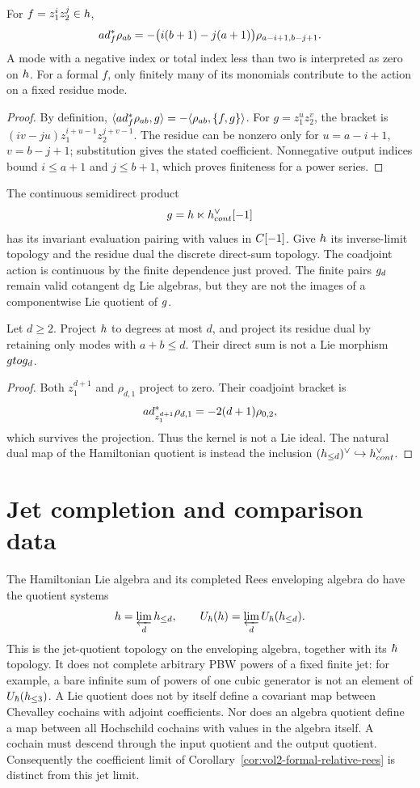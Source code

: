 \begin{proposition}
For $f=z_1^iz_2^j\in h$,
\[
 ad_f^*\rho_{ab}
 =-\bigl(i(b+1)-j(a+1)\bigr)
       \rho_{a-i+1,b-j+1}.
\]
A mode with a negative index or total index less than two is interpreted
as zero on $h$.  For a formal $f$, only finitely many of its monomials
contribute to the action on a fixed residue mode.
\end{proposition}
\begin{proof}
By definition,
$\langle ad_f^*\rho_{ab},g\rangle
=-\langle\rho_{ab},\{f,g\}\rangle$.
For $g=z_1^uz_2^v$, the bracket is
$(iv-ju)z_1^{i+u-1}z_2^{j+v-1}$.
The residue can be nonzero only for
$u=a-i+1$, $v=b-j+1$; substitution gives the stated coefficient.
Nonnegative output indices bound $i\le a+1$ and $j\le b+1$,
which proves finiteness for a power series.
\end{proof}

The continuous semidirect product
\[
 g=h\ltimes h^\vee_{cont}[-1]
\]
has its invariant evaluation pairing with values in $C[-1]$.
Give $h$ its inverse-limit
topology and the residue dual the discrete direct-sum topology.
The coadjoint action is continuous by the finite dependence just proved.
The finite pairs $g_d$ remain valid cotangent dg Lie algebras, but
they are not the images of a componentwise Lie quotient of $g$.

\begin{proposition}
Let $d\ge2$.  Project $h$ to degrees at most $d$, and project its
residue dual by retaining only modes with $a+b\le d$.
Their direct sum is not a Lie morphism $gtog_d$.
\end{proposition}
\begin{proof}
Both $z_1^{d+1}$ and $\rho_{d,1}$ project to zero.  Their coadjoint
bracket is
\[
 ad_{z_1^{d+1}}^*\rho_{d,1}
 =-2(d+1)\rho_{0,2},
\]
which survives the projection.  Thus the kernel is not a Lie ideal.
The natural dual map of the Hamiltonian quotient is instead the
inclusion $(h_{\le d})^\vee\hookrightarrow h^\vee_{cont}$.
\end{proof}

\section{Jet completion and comparison data}
The Hamiltonian Lie algebra and its completed Rees enveloping algebra
do have the quotient systems
\[
 h=\varprojlim_dh_{\le d},\qquad
 U_\hbar(h)=\varprojlim_d U_\hbar(h_{\le d}).
\]
This is the jet-quotient topology on the enveloping algebra, together
with its $\hbar$ topology.  It does not complete arbitrary PBW powers
of a fixed finite jet: for example, a bare infinite sum of powers of
one cubic generator is not an element of $U_\hbar(h_{\le3})$.
A Lie quotient does not by itself define a covariant map between
Chevalley cochains with adjoint coefficients.
Nor does an algebra quotient define a map between all Hochschild
cochains with values in the algebra itself.
A cochain must descend through the input quotient and the output quotient.
Consequently the coefficient limit of
Corollary~\ref{cor:vol2-formal-relative-rees} is distinct from this jet limit.

